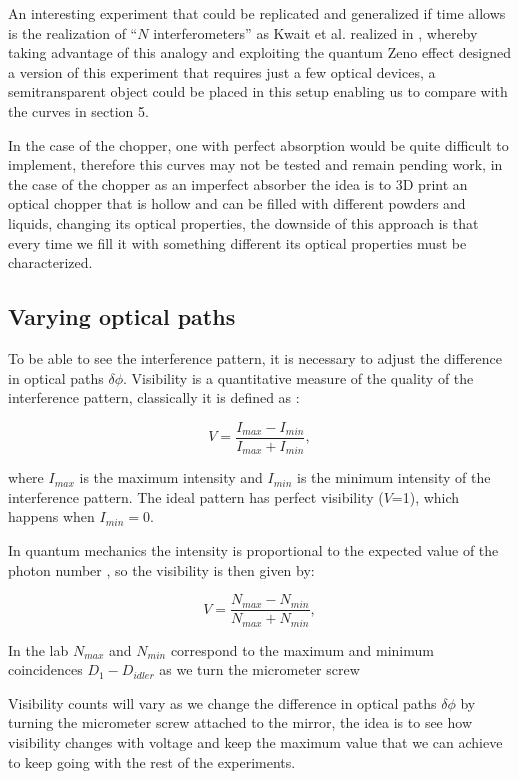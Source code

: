 \documentclass[12pt]{book}
\begin{document}
An interesting experiment that could be replicated and generalized if time allows is the realization of ``$N$ interferometers'' as Kwait et al. realized in \cite{exp}, whereby taking advantage of this analogy and exploiting the quantum Zeno effect \cite{zeno} designed a version of this experiment that requires just a few optical devices, a semitransparent object could be placed in this setup enabling us to compare with the curves in section 5.


In the case of the chopper, one with perfect absorption would be quite difficult to implement, therefore this curves may not be tested and remain pending work, in the case of the chopper as an imperfect absorber the idea is to 3D print an optical chopper that is hollow and can be filled with different powders and liquids, changing its optical properties, the downside of this approach is that every time we fill it with something different its optical properties must be characterized.



\subsection{Varying optical paths}

To be able to see the interference pattern, it is necessary to adjust the difference in optical paths $\delta \phi$. Visibility is a quantitative measure of the quality of the interference pattern, classically it is defined as \cite{hecht}:

\begin{equation}
V=\frac{I_{max}-I_{min}}{I_{max}+I_{min}},
\end{equation}

where $I_{max}$ is the maximum intensity and $I_{min}$ is the minimum intensity of the interference pattern. The ideal pattern has perfect visibility ($V$=1), which happens when $I_{min}=0$.

In quantum mechanics the intensity is proportional to the expected value of the photon number \cite {glauber}, so the visibility is then given by:

\begin{equation}
V=\frac{N_{max}-N_{min}}{N_{max}+N_{min}},
\end{equation}

In the lab $N_{max}$ and $N_{min}$ correspond to the maximum and minimum coincidences $D_{1}-D_{idler}$ as we turn the micrometer screw

Visibility counts will vary as we change the difference in optical paths $\delta\phi$ by turning the micrometer screw attached to the mirror, the idea is to see how visibility changes with voltage and keep the maximum value that we can achieve to keep going with the rest of the experiments.
  
\end{document}

